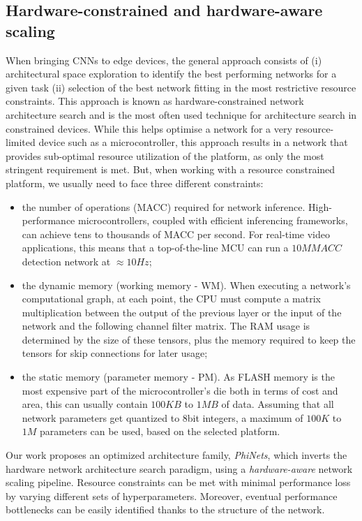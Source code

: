 \subsection{Hardware-constrained and hardware-aware scaling}
\label{has}
When bringing CNNs to edge devices, the general approach consists of (i) architectural space exploration to identify the best performing networks for a given task (ii) selection of the best network fitting in the most restrictive resource constraints. This approach is known as hardware-constrained network architecture search and is the most often used technique for architecture search in constrained devices. While this helps optimise a network for a very resource-limited device such as a microcontroller, this approach results in a network that provides sub-optimal resource utilization of the platform, as only the most stringent requirement is met. But, when working with a resource constrained platform, we usually need to face three different constraints:
\begin{itemize}
    \item the number of operations (MACC) required for network inference. High-performance microcontrollers, coupled with efficient inferencing frameworks, can achieve tens to thousands of MACC per second. For real-time video applications, this means that a top-of-the-line MCU can run a $10MMACC$ detection network at $\approx 10Hz$;
    \item the dynamic memory (working memory - WM). When executing a network's computational graph, at each point, the CPU must compute a matrix multiplication between the output of the previous layer or the input of the network and the following channel filter matrix. The RAM usage is determined by the size of these tensors, plus the memory required to keep the tensors for skip connections for later usage;
    \item the static memory (parameter memory - PM). As FLASH memory is the most expensive part of the microcontroller's die both in terms of cost and area, this can usually contain $100KB$ to $1MB$ of data. Assuming that all network parameters get quantized to 8bit integers, a maximum of $100K$ to $1M$ parameters can be used, based on the selected platform.
\end{itemize}
Our work proposes an optimized architecture family, \textit{PhiNets}, which inverts the hardware network architecture search paradigm, using a \textit{hardware-aware} network scaling pipeline. Resource constraints can be met with minimal performance loss by varying different sets of hyperparameters. Moreover, eventual performance bottlenecks can be easily identified thanks to the structure of the network.


